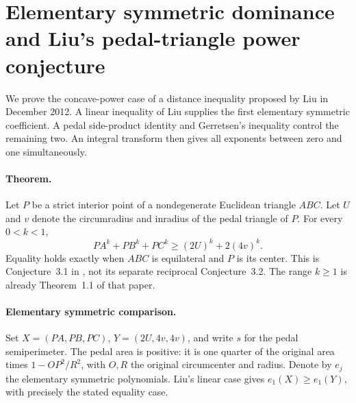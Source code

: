 \documentclass[11pt,a4paper]{article}
\numberwithin{equation}{section}
\theoremstyle{definition}
\theoremstyle{remark}
\newenvironment{sectionabstract}{\par\smallskip\begingroup\small\noindent}{\par\endgroup\medskip}
\begin{document}
\par\endgroup

\begingroup

\section{\texorpdfstring{Elementary symmetric dominance and Liu's pedal-triangle power conjecture}{Elementary symmetric dominance and Liu's pedal-triangle power conjecture}}\label{section:r49meiji}
\par\medskip

\begin{sectionabstract}
We prove the concave-power case of a distance inequality proposed by Liu in December 2012. A linear inequality of Liu supplies the first elementary symmetric coefficient. A pedal side-product identity and Gerretsen's inequality control the remaining two. An integral transform then gives all exponents between zero and one simultaneously.
\end{sectionabstract}
\paragraph{Theorem.}
Let $P$ be a strict interior point of a nondegenerate Euclidean triangle $ABC$. Let $U$ and $v$ denote the circumradius and inradius of the pedal triangle of $P$. For every $0<k<1$,
\[
 PA^k+PB^k+PC^k\ge(2U)^k+2(4v)^k .
\]
Equality holds exactly when $ABC$ is equilateral and $P$ is its center. This is Conjecture~3.1 in \cite{r49meiji:liu}, not its separate reciprocal Conjecture~3.2. The range $k\ge1$ is already Theorem~1.1 of that paper.

\paragraph{Elementary symmetric comparison.}
Set $X=(PA,PB,PC)$, $Y=(2U,4v,4v)$, and write $s$ for the pedal semiperimeter. The pedal area is positive: it is one quarter of the original area times $1-OP^2/R^2$, with $O,R$ the original circumcenter and radius. Denote by $e_j$ the elementary symmetric polynomials. Liu's linear case \cite[Thm.~1.1, $k=1$]{r49meiji:liu} gives $e_1(X)\ge e_1(Y)$, with precisely the stated equality case.
\end{document}
